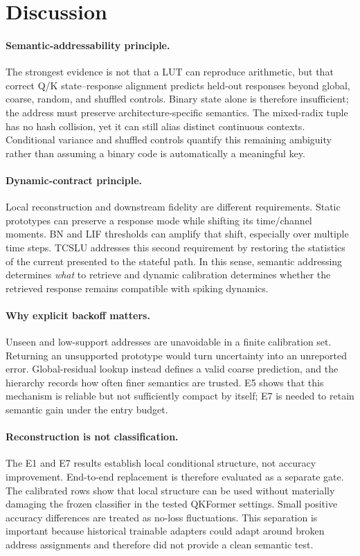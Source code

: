 \section{Discussion}
\label{sec:discussion}

\paragraph{Semantic-addressability principle.}
The strongest evidence is not that a LUT can reproduce arithmetic, but that
correct Q/K state--response alignment predicts held-out responses beyond
global, coarse, random, and shuffled controls. Binary state alone is therefore
insufficient; the address must preserve architecture-specific semantics. The
mixed-radix tuple has no hash collision, yet it can still alias distinct
continuous contexts. Conditional variance and shuffled controls quantify this
remaining ambiguity rather than assuming a binary code is automatically a
meaningful key.

\paragraph{Dynamic-contract principle.}
Local reconstruction and downstream fidelity are different requirements.
Static prototypes can preserve a response mode while shifting its
time/channel moments. BN and LIF thresholds can amplify that shift, especially
over multiple time steps. TCSLU addresses this second requirement by restoring
the statistics of the current presented to the stateful path. In this sense,
semantic addressing determines \emph{what} to retrieve and dynamic calibration
determines whether the retrieved response remains compatible with spiking
dynamics.

\paragraph{Why explicit backoff matters.}
Unseen and low-support addresses are unavoidable in a finite calibration set.
Returning an unsupported prototype would turn uncertainty into an unreported
error. Global-residual lookup instead defines a valid coarse prediction, and
the hierarchy records how often finer semantics are trusted. E5 shows that
this mechanism is reliable but not sufficiently compact by itself; E7 is
needed to retain semantic gain under the entry budget.

\paragraph{Reconstruction is not classification.}
The E1 and E7 results establish local conditional structure, not accuracy
improvement. End-to-end replacement is therefore evaluated as a separate gate.
The calibrated rows show that local structure can be used without materially
damaging the frozen classifier in the tested QKFormer settings. Small positive
accuracy differences are treated as no-loss fluctuations. This separation is
important because historical trainable adapters could adapt around broken
address assignments and therefore did not provide a clean semantic test.

